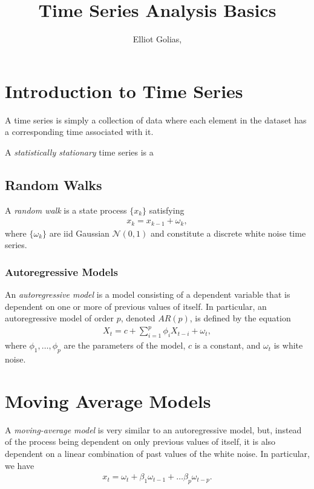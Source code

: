 \documentclass[a4paper,11pt]{article}
\title{\boldmath Time Series Analysis Basics}
\author[a,b,1]{Elliot Golias,\note{Corresponding author.}}
\affiliation[a]{Case Western Reserve University,\\some-street, Country}
\begin{document}
 
\maketitle
\flushbottom

\section{Introduction to Time Series}
A time series is simply a collection of data where each element in the dataset has a corresponding time associated with it.

A \textit{statistically stationary} time series is a 

\subsection{Random Walks}
%
A \textit{random walk} is a state process $\{x_k\}$ satisfying
%
\begin{align}
	x_k = x_{k-1} + \omega_k,
\end{align}
%
where $\{\omega_k\}$ are iid Gaussian $\mathcal{N}(0, 1)$ and constitute a discrete white noise time series.

\subsubsection{Autoregressive Models}
%
An \textit{autoregressive model} is a model consisting of a dependent variable that is dependent on one or more of previous values of itself. In particular, an autoregressive model of order $p$, denoted $AR(p)$, is defined by the equation
%
\begin{align}
X_t = c + \sum^p_{i=1} \phi_i X_{t-i} + \omega_t,
\end{align}
%
where $\phi_1, \dots, \phi_p$ are the parameters of the model, $c$ is a constant, and $\omega_t$ is white noise.

\section{Moving Average Models}
%
A \textit{moving-average model} is very similar to an autoregressive model, but, instead of the process being dependent on only previous values of itself, it is also dependent on a linear combination of past values of the white noise. In particular, we have
%
\begin{align}
	x_t = \omega_t + \beta_1 \omega_{t-1} + \dots \beta_p \omega_{t-p}.
\end{align}
%
\end{document}
